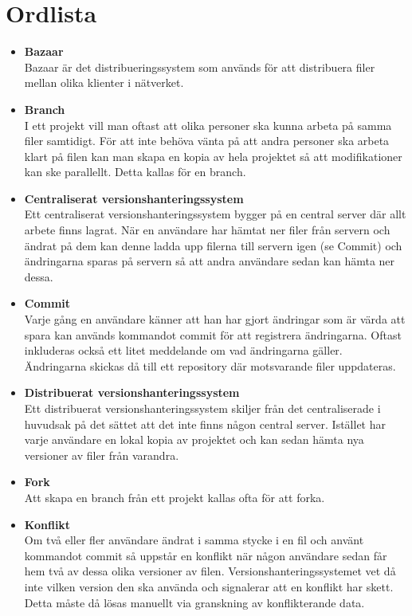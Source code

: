 \section{Ordlista}
\begin{itemize}
        \item \textbf{Bazaar}
        \\Bazaar är det distribueringssystem som används för att distribuera filer mellan olika klienter i nätverket.

	\item \textbf{Branch}
	\\I ett projekt vill man oftast att olika personer ska kunna arbeta på samma filer samtidigt. För att inte behöva vänta på att andra personer ska arbeta klart på filen kan man skapa en kopia av hela projektet så att modifikationer kan ske parallellt. Detta kallas för en branch.
	
	\item \textbf{Centraliserat versionshanteringssystem}
	\\Ett centraliserat versionshanteringssystem bygger på en central server där allt arbete finns lagrat. När en användare har hämtat ner filer från servern och ändrat på dem kan denne ladda upp filerna till servern igen (se Commit) och ändringarna sparas på servern så att andra användare sedan kan hämta ner dessa.
	
	\item \textbf{Commit}
	\\Varje gång en användare känner att han har gjort ändringar som är värda att spara kan används kommandot commit för att registrera ändringarna. Oftast inkluderas också ett litet meddelande om vad ändringarna gäller. Ändringarna skickas då till ett repository där motsvarande filer uppdateras.
	
	\item \textbf{Distribuerat versionshanteringssystem}
	\\Ett distribuerat versionshanteringssystem skiljer från det centraliserade i huvudsak på det sättet att det inte finns någon central server. Istället har varje användare en lokal kopia av projektet och kan sedan hämta nya versioner av filer från varandra.
	
	\item \textbf{Fork}
	\\Att skapa en branch från ett projekt kallas ofta för att forka.
	
	\item \textbf{Konflikt}
	\\Om två eller fler användare ändrat i samma stycke i en fil och använt kommandot commit så uppstår en konflikt när någon användare sedan får hem två av dessa olika versioner av filen. Versionshanteringssystemet vet då inte vilken version den ska använda och signalerar att en konflikt har skett. Detta måste då lösas manuellt via granskning av konflikterande data.


\end{itemize}
